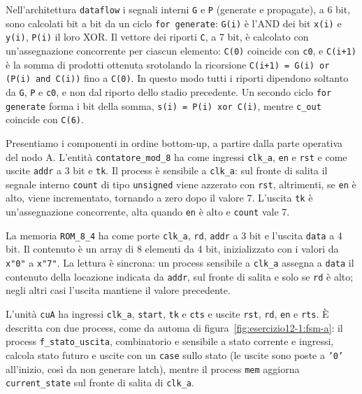 Nell'architettura \texttt{dataflow} i segnali interni \texttt{G} e \texttt{P} (generate e propagate), a 6 bit, sono calcolati bit a bit da un ciclo \texttt{for generate}: \texttt{G(i)} è l'AND dei bit \texttt{x(i)} e \texttt{y(i)}, \texttt{P(i)} il loro XOR. Il vettore dei riporti \texttt{C}, a 7 bit, è calcolato con un'assegnazione concorrente per ciascun elemento: \texttt{C(0)} coincide con \texttt{c0}, e \texttt{C(i+1)} è la somma di prodotti ottenuta srotolando la ricorsione \texttt{C(i+1) = G(i) or (P(i) and C(i))} fino a \texttt{C(0)}. In questo modo tutti i riporti dipendono soltanto da \texttt{G}, \texttt{P} e \texttt{c0}, e non dal riporto dello stadio precedente. Un secondo ciclo \texttt{for generate} forma i bit della somma, \texttt{s(i) = P(i) xor C(i)}, mentre \texttt{c\_out} coincide con \texttt{C(6)}.


\implementazione

Presentiamo i componenti in ordine bottom-up, a partire dalla parte operativa del nodo A. L'entità \texttt{contatore\_mod\_8} ha come ingressi \texttt{clk\_a}, \texttt{en} e \texttt{rst} e come uscite \texttt{addr} a 3 bit e \texttt{tk}. Il process è sensibile a \texttt{clk\_a}: sul fronte di salita il segnale interno \texttt{count} di tipo \texttt{unsigned} viene azzerato con \texttt{rst}, altrimenti, se \texttt{en} è alto, viene incrementato, tornando a zero dopo il valore 7. L'uscita \texttt{tk} è un'assegnazione concorrente, alta quando \texttt{en} è alto e \texttt{count} vale 7.


La memoria \texttt{ROM\_8\_4} ha come porte \texttt{clk\_a}, \texttt{rd}, \texttt{addr} a 3 bit e l'uscita \texttt{data} a 4 bit. Il contenuto è un array di 8 elementi da 4 bit, inizializzato con i valori da \texttt{x"0"} a \texttt{x"7"}. La lettura è sincrona: un process sensibile a \texttt{clk\_a} assegna a \texttt{data} il contenuto della locazione indicata da \texttt{addr}, sul fronte di salita e solo se \texttt{rd} è alto; negli altri casi l'uscita mantiene il valore precedente.


L'unità \texttt{cuA} ha ingressi \texttt{clk\_a}, \texttt{start}, \texttt{tk} e \texttt{cts} e uscite \texttt{rst}, \texttt{rd}, \texttt{en} e \texttt{rts}. È descritta con due process, come da automa di figura~\ref{fig:esercizio12-1:fsm-a}: il process \texttt{f\_stato\_uscita}, combinatorio e sensibile a stato corrente e ingressi, calcola stato futuro e uscite con un \texttt{case} sullo stato (le uscite sono poste a \texttt{'0'} all'inizio, così da non generare latch), mentre il process \texttt{mem} aggiorna \texttt{current\_state} sul fronte di salita di \texttt{clk\_a}.

